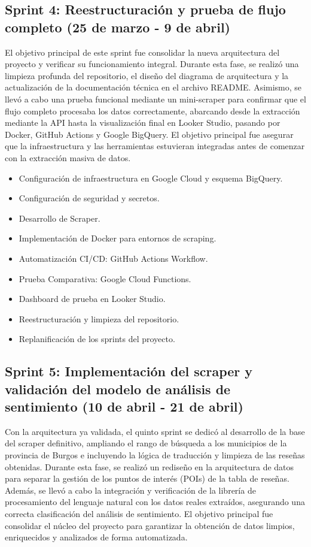\subsection{Sprint 4: Reestructuración y prueba de flujo completo (25 de marzo - 9 de abril)}
El objetivo principal de este sprint fue consolidar la nueva arquitectura del proyecto y verificar su funcionamiento integral. Durante esta fase, se realizó una limpieza profunda del repositorio, el diseño del diagrama de arquitectura y la actualización de la documentación técnica en el archivo README. Asimismo, se llevó a cabo una prueba funcional mediante un mini-scraper para confirmar que el flujo completo procesaba los datos correctamente, abarcando desde la extracción mediante la API hasta la visualización final en Looker Studio, pasando por Docker, GitHub Actions y Google BigQuery. El objetivo principal fue asegurar que la infraestructura y las herramientas estuvieran integradas antes de comenzar con la extracción masiva de datos.

\begin{itemize}
    \item Configuración de infraestructura en Google Cloud y esquema BigQuery.
    \item Configuración de seguridad y secretos.
    \item Desarrollo de Scraper.
    \item Implementación de Docker para entornos de scraping.
    \item Automatización CI/CD: GitHub Actions Workflow.
    \item Prueba Comparativa: Google Cloud Functions.
    \item Dashboard de prueba en Looker Studio.
    \item Reestructuración y limpieza del repositorio.
    \item Replanificación de los sprints del proyecto.
\end{itemize}

\subsection{Sprint 5: Implementación del scraper y validación del modelo de análisis de sentimiento (10 de abril - 21 de abril)}
Con la arquitectura ya validada, el quinto sprint se dedicó al desarrollo de la base del scraper definitivo, ampliando el rango de búsqueda a los municipios de la provincia de Burgos e incluyendo la lógica de traducción y limpieza de las reseñas obtenidas. Durante esta fase, se realizó un rediseño en la arquitectura de datos para separar la gestión de los puntos de interés (POIs) de la tabla de reseñas. Además, se llevó a cabo la integración y verificación de la librería de procesamiento del lenguaje natural con los datos reales extraídos, asegurando una correcta clasificación del análisis de sentimiento. El objetivo principal fue consolidar el núcleo del proyecto para garantizar la obtención de datos limpios, enriquecidos y analizados de forma automatizada.

